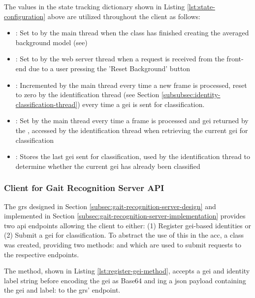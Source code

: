 The values in the state tracking dictionary shown in Listing \ref{lst:state-configuration} above are utilized throughout the client as follows:

\begin{itemize}
	\item {}: Set to  by the main thread when the  class has finished creating the averaged background model (see)
	\item {}: Set to  by the web server thread when a request is received from the front-end due to a user pressing the 'Reset Background' button
	\item {}: Incremented by the main thread every time a new frame is processed, reset to zero by the identification thread (see Section \ref{subsubsec:identity-classification-thread}) every time a \ac{gei} is sent for classification.
	\item {}: Set by the main thread every time a frame is processed and \ac{gei} returned by the , accessed by the identification thread when retrieving the current \ac{gei} for classification
	\item {}: Stores the last \ac{gei} sent for classification, used by the identification thread to determine whether the current \ac{gei} has already been classified
\end{itemize}

\subsubsection{Client for Gait Recognition Server API}
\label{subsec:server-api-client-implementation}

The \ac{grs} designed in Section \ref{subsec:gait-recognition-server-design} and implemented in Section \ref{subsec:gait-recognition-server-implementation} provides two \ac{api} endpoints allowing the client to either:
(1) Register \ac{gei}-based identities or (2) Submit a \ac{gei} for classification.
To abstract the use of this in the \ac{acc}, a class  was created, providing two methods:  and  which are used to submit requests to the respective endpoints.

The  method, shown in Listing \ref{lst:register-gei-method}, accepts a \ac{gei} and identity label string before encoding the \ac{gei} as Base64 and ing a \ac{json} payload containing the \ac{gei} and label:
 to the \ac{grs}'  endpoint. 

